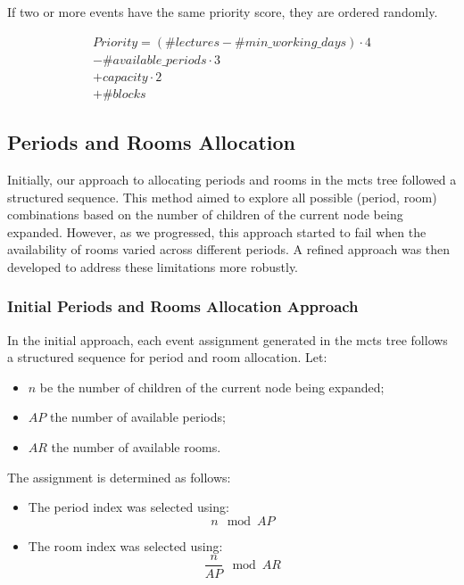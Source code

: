 If two or more events have the same priority score, they are ordered randomly.

\begin{equation}
  \begin{aligned}
	Priority = (\#lectures - \#min\_working\_days) \cdot 4 \\
	           - \#available\_periods \cdot 3 \\
	          + capacity \cdot 2 \\
	          + \#blocks\label{priority}
  \end{aligned}
\end{equation}


\subsection{Periods and Rooms Allocation}

Initially, our approach to allocating periods and rooms in the \ac{mcts} tree followed a structured sequence. This method aimed to explore all possible (period, room) combinations based on the number of children of the current node being expanded. However, as we progressed, this approach started to fail when the availability of rooms varied across different periods. A refined approach was then developed to address these limitations more robustly.

\subsubsection{Initial Periods and Rooms Allocation Approach}

In the initial approach, each event assignment generated in the \ac{mcts} tree follows a structured sequence for period and room allocation. 
Let:
\begin{itemize}
\item \(n\) be the number of children of the current node being expanded;
\item \(AP\) the number of available periods;
\item \(AR\) the number of available rooms. 
\end{itemize}

The assignment is determined as follows:

\begin{itemize}
	\item The period index was selected using: 
		\begin{equation}
		n \mod AP\label{period_allocation}
		\end{equation}
	
	\item The room index was selected using:
		\begin{equation}
		\frac{n}{AP} \mod AR\label{room_allocation}
		\end{equation}
\end{itemize}

